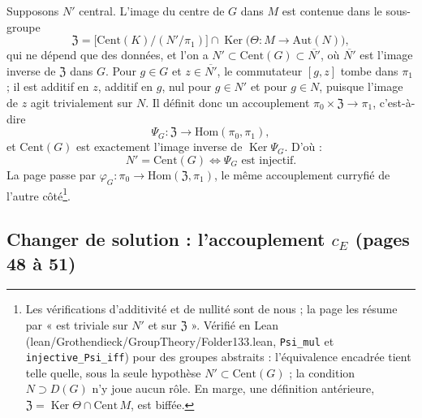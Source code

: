 \documentclass[11pt,a4paper]{article}
\begin{document}
Supposons $N'$ central. L'image du centre de $G$ dans $M$ est contenue dans
le sous-groupe
\[
\mathfrak{Z} = \bigl[\mathrm{Cent}(K)/(N'/\pi_1)\bigr] \cap
\operatorname{Ker}\bigl(\Theta \colon M \to \mathrm{Aut}(N)\bigr),
\]
qui ne dépend que des données, et l'on a $N' \subset \mathrm{Cent}(G)
\subset \overline{N'}$, où $\overline{N'}$ est l'image inverse de
$\mathfrak{Z}$ dans $G$. Pour $g \in G$ et $z \in \overline{N'}$, le
commutateur $[g, z]$ tombe dans $\pi_1$ ; il est additif en $z$, additif en
$g$, nul pour $g \in N'$ et pour $g \in N$, puisque l'image de $z$ agit
trivialement sur $N$. Il définit donc un accouplement
$\pi_0 \times \mathfrak{Z} \to \pi_1$, c'est-à-dire
\[
\Psi_G \colon \mathfrak{Z} \longrightarrow \mathrm{Hom}(\pi_0, \pi_1),
\]
et $\mathrm{Cent}(G)$ est exactement l'image inverse de
$\operatorname{Ker}\Psi_G$. D'où :
\[
N' = \mathrm{Cent}(G) \iff \Psi_G \text{ est injectif.}
\]
La page passe par $\varphi_G \colon \pi_0 \to \mathrm{Hom}(\mathfrak{Z},
\pi_1)$, le même accouplement curryfié de l'autre côté\footnote{Les
vérifications d'additivité et de nullité sont de nous ; la page les
résume par « est triviale sur $N'$ et sur $\mathfrak{Z}$ ». Vérifié en Lean
(lean/Grothendieck/GroupTheory/Folder133.lean, \texttt{Psi\_mul} et
\texttt{injective\_Psi\_iff}) pour des groupes abstraits : l'équivalence
encadrée tient telle quelle, sous la seule hypothèse
$N' \subset \mathrm{Cent}(G)$ ; la condition $N \supset D(G)$ n'y joue aucun
rôle. En marge, une
définition antérieure, $\mathfrak{Z} = \operatorname{Ker}\Theta \cap
\mathrm{Cent}\,M$, est biffée.}.

\subsection*{Changer de solution : l'accouplement $c_E$ (pages 48 à 51)}
\end{document}
